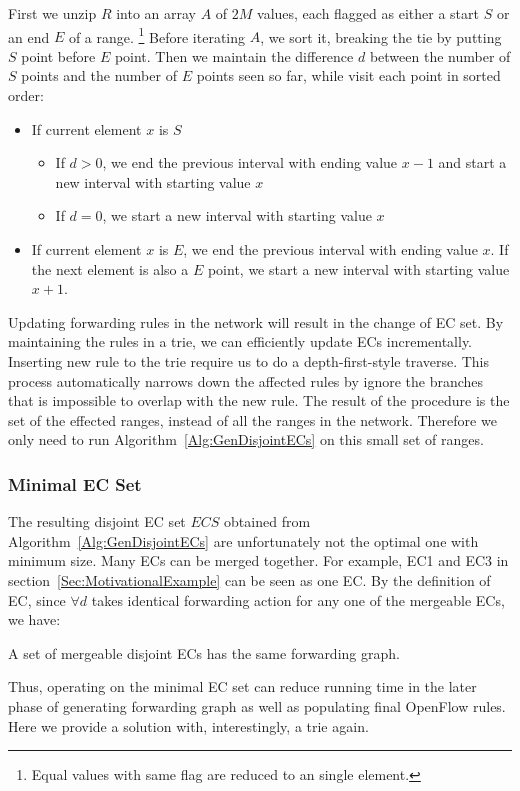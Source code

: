 First we unzip $R$ into an array $A$ of $2M$ values,
each flagged as either a start $S$ or an end $E$ of a range.
\footnote{Equal values with same flag are reduced to an single element.}
Before iterating $A$, we sort it, breaking the tie by putting $S$ point before $E$ point.
Then we maintain the difference $d$ between the number of $S$ points and the number of $E$ points
seen so far, while visit each point in sorted order:
\begin{itemize}
\item If current element $x$ is $S$
        \begin{itemize}
                \item If $d > 0$, we end the previous interval with ending value $x - 1$
                        and start a new interval with starting value $x$
                \item If $d = 0$, we start a new interval with starting value $x$
        \end{itemize}
\item If current element $x$ is $E$, we end the previous interval with ending value $x$.
        If the next element is also a $E$ point, we start a new interval with starting value
        $x + 1$.
\end{itemize}

Updating forwarding rules in the network will result in the change of EC set.
By maintaining the rules in a trie, we can efficiently update ECs incrementally.
Inserting new rule to the trie require us to do a depth-first-style traverse.
This process automatically narrows down the affected rules by ignore the branches
that is impossible to overlap with the new rule.
The result of the procedure is the set of the effected ranges, instead of all the
ranges in the network.
Therefore we only need to run Algorithm~\ref{Alg:GenDisjointECs} on this small set of ranges.


\subsubsection{Minimal EC Set}
The resulting disjoint EC set $ECS$ obtained from Algorithm~\ref{Alg:GenDisjointECs} are unfortunately not the optimal one with minimum size.
Many ECs can be merged together.
For example, EC1 and EC3 in section~\ref{Sec:MotivationalExample} can be seen as one EC.
By the definition of EC, since $\forall d$ takes identical forwarding action for any one of
the mergeable ECs, we have:
\begin{lemma}
A set of mergeable disjoint ECs has the same forwarding graph.
\label{Lemma:MergeFG}
\end{lemma}
Thus, operating on the minimal EC set can reduce running time in the later phase of
generating forwarding graph as well as populating final OpenFlow rules.
Here we provide a solution with, interestingly, a trie again.


